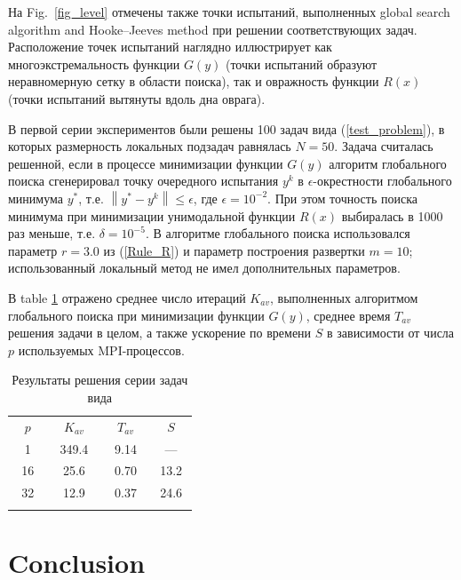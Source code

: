 \documentclass{svproc}
\begin{document}
На Fig.~\ref{fig_level} отмечены также точки испытаний, выполненных global search algorithm and Hooke--Jeeves method при решении соответствующих задач. Расположение точек испытаний наглядно иллюстрирует как многоэкстремальность функции $G(y)$ (точки испытаний образуют неравномерную сетку в области поиска), так и овражность функции $R(x)$ (точки испытаний вытянуты вдоль дна оврага).


В первой серии экспериментов были решены 100 задач вида (\ref{test_problem}), в которых размерность локальных подзадач равнялась $N=50$.
Задача считалась решенной, если в процессе минимизации функции $G(y)$ алгоритм глобального поиска сгенерировал точку очередного испытания $y^k$ в $\epsilon$-окрестности глобального минимума $y^*$, т.е. $\left\|y^* - y^k\right\|\leq\epsilon$, где $\epsilon = 10^{-2}$. 
При этом точность поиска минимума при минимизации унимодальной функции $R(x)$ выбиралась в 1000 раз меньше, т.е. $\delta = 10^{-5}$.
В алгоритме глобального поиска использовался параметр $r=3.0$ из (\ref{Rule_R}) и параметр построения развертки $m=10$; использованный локальный метод не имел дополнительных параметров.


В table \ref{tab1} отражено среднее число итераций $K_{av}$, выполненных алгоритмом глобального поиска при минимизации функции $G(y)$, среднее время $T_{av}$ решения задачи в целом, а также ускорение по времени $S$  в зависимости от числа $p$ используемых MPI-процессов. 

\begin{table}
\centering
\caption{Результаты решения серии задач вида}\label{tab1}
\begin{tabular}{cccc}
\hline\noalign{\smallskip}
 $\;\;\;p\;\;\;$  &  $\;\;\;K_{av}\;\;\;$ &  $\;\;\;T_{av}\;\;\;$ & $\;\;\;S\;\;\;$ \\
\noalign{\smallskip}\hline\noalign{\smallskip}
 1  & 349.4  & 9.14 & ---  \\
 16 & 25.6   & 0.70 & 13.2 \\
 32 & 12.9   & 0.37 & 24.6 \\
\noalign{\smallskip}\hline
\end{tabular}
\end{table}



\section{Conclusion} %
\end{document}
